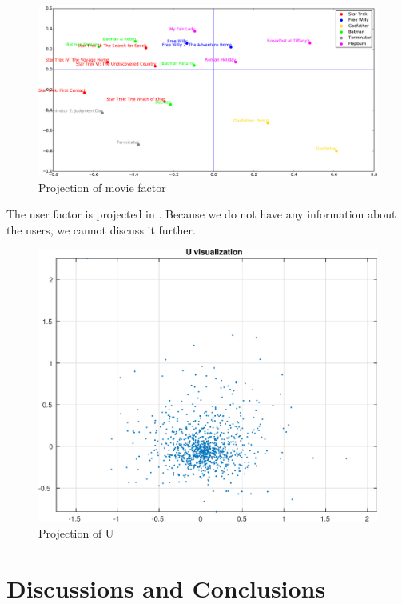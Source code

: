 \documentclass[12pt]{article}
\begin{document}
\begin{figure}[h!]
  \centering
      \includegraphics[width=\textwidth]{3_Series-crop.pdf}
  \caption{Projection of movie factor}
  \label{fig:series}
\end{figure}


The user factor is projected in . Because we do not have any information about the users, we cannot discuss it further.
\begin{figure}[h!]
  \centering
      \includegraphics[width=\textwidth]{U-crop.pdf}
  \caption{Projection of U}
  \label{fig:U}
\end{figure}

\clearpage
\section{Discussions and Conclusions}
\end{document}

